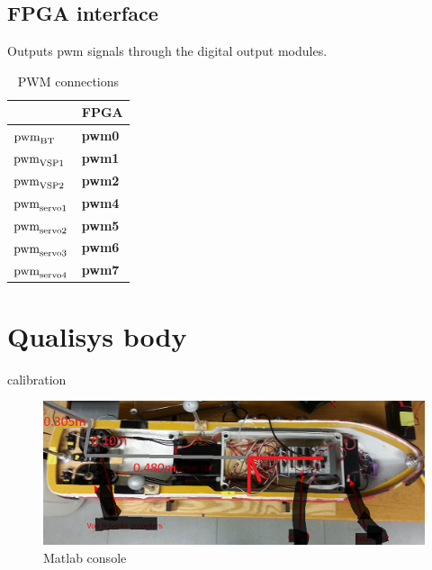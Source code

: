 \documentclass[a4paper,twoside,english]{report}
\providecommand{\tabularnewline}{\\}
\begin{document}
\subsection{FPGA interface}

Outputs pwm signals through the digital output modules.

\begin{table}[h!]
\begin{centering}
\begin{tabular}{>{\bfseries}l>{\bfseries}l}
\toprule 
\multicolumn{1}{l}{uao2pwm} & FPGA\tabularnewline
\midrule 
$\text{\text{pwm}}_{\text{BT}}$ & pwm0\tabularnewline
$\text{\text{pwm}}_{\text{VSP1}}$ & pwm1\tabularnewline
$\text{\text{pwm}}_{\text{VSP2}}$ & pwm2\tabularnewline
$\text{\text{pwm}}_{\text{servo1}}$ & pwm4\tabularnewline
$\text{\text{pwm}}_{\text{servo2}}$ & pwm5\tabularnewline
$\text{\text{pwm}}_{\text{servo3}}$ & pwm6\tabularnewline
$\text{\text{pwm}}_{\text{servo4}}$ & pwm7\tabularnewline
\bottomrule
\end{tabular}\caption{PWM connections}
\par\end{centering}
\centering{}\label{tab:cRIO-actuator} 
\end{table}

\FloatBarrier

\newpage{}

\section{Qualisys body}

calibration

\begin{figure}[!h]
\centering \includegraphics[scale=0.45]{fig/qualisys_CSE1_frame} \caption{Matlab console}

\label{fig: matlab console-1-1} 
\end{figure}

\clearpage{}



\end{document}
